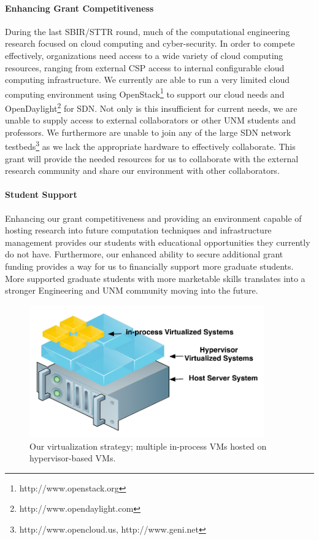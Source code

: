 \documentclass[12pt,letterpaper]{article}
\begin{document}
\paragraph{Enhancing Grant Competitiveness} During the last SBIR/STTR round, much of the computational engineering research focused on cloud computing and cyber-security. In order to compete effectively, organizations need access to a wide variety of cloud computing resources, ranging from external CSP access to internal configurable cloud computing infrastructure. We currently are able to run a very limited cloud computing environment using OpenStack\footnote{http://www.openstack.org} to support our cloud needs and OpenDaylight\footnote{http://www.opendaylight.com} for SDN. Not only is this insufficient for current needs, we are unable to supply access to external collaborators or other UNM students and professors. We furthermore are unable to join any of the large SDN network testbeds\footnote{http://www.opencloud.us, http://www.geni.net} as we lack the appropriate hardware to effectively collaborate. This grant will provide the needed resources for us to collaborate with the external research community and share our environment with other collaborators.

\paragraph{Student Support} Enhancing our grant competitiveness and providing an environment capable of hosting research into future computation techniques and infrastructure management provides our students with educational opportunities they currently do not have. Furthermore, our enhanced ability to secure additional grant funding provides a way for us to financially support more graduate students. More supported graduate students with more marketable skills translates into a stronger Engineering and UNM community moving into the future.

\begin{figure}[!t]
\centering
\includegraphics[width=0.9\textwidth]{images/virtualization.pdf}
\caption{Our virtualization strategy;  multiple in-process VMs hosted on hypervisor-based VMs.}
\label{fig:virtual}
\end{figure}
\end{document}
